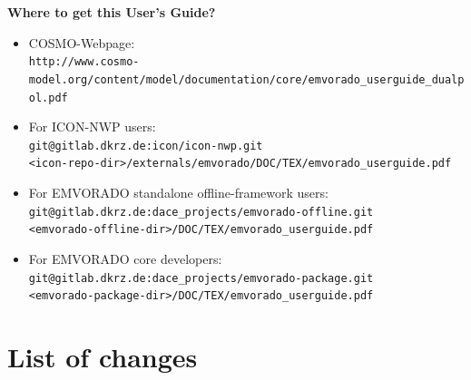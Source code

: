 \documentclass[10pt,a4paper,twoside,headinclude,footinclude,parskip=half]{scrartcl}
\newcommand{\myaktuellesection}{sec:intro}%
\newcommand{\labelsec}[1]{\label{#1}\renewcommand{\myaktuellesection}{#1}}%
\newcommand{\labelsec}[1]{\label{#1}}%
\newlength{\lenspeins}%
\newlength{\lenspzwei}%
\newlength{\lenspdrei}%
\begin{document}
\begin{minipage}{\linewidth}
\textbf{\Large Where to get this User's Guide?}\\
\begin{itemize}
\item COSMO-Webpage:\\[\itemsep]
  \verb|http://www.cosmo-model.org/content/model/documentation/core/emvorado_userguide_dualpol.pdf|\\[-0.6em]
\item For ICON-NWP users:\\[\itemsep]
  \verb|git@gitlab.dkrz.de:icon/icon-nwp.git| \\[\itemsep]
  \verb|<icon-repo-dir>/externals/emvorado/DOC/TEX/emvorado_userguide.pdf| \\[-0.6em]
\item For EMVORADO standalone offline-framework users:\\[\itemsep]
  \verb|git@gitlab.dkrz.de:dace_projects/emvorado-offline.git| \\[\itemsep]
  \verb|<emvorado-offline-dir>/DOC/TEX/emvorado_userguide.pdf| \\[-0.6em]
\item For EMVORADO core developers:\\[\itemsep]
  \verb|git@gitlab.dkrz.de:dace_projects/emvorado-package.git| \\[\itemsep]
  \verb|<emvorado-package-dir>/DOC/TEX/emvorado_userguide.pdf| \\[-0.6em]
\end{itemize}
\end{minipage}

\thispagestyle{empty}



\cleardoublepage

\tableofcontents
\labelsec{sec:inhalt}

\clearpage

\section{List of changes}
\labelsec{sec:changelog}

\end{document}
